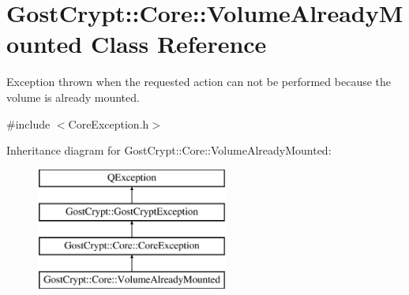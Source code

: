 \hypertarget{class_gost_crypt_1_1_core_1_1_volume_already_mounted}{}\section{Gost\+Crypt\+:\+:Core\+:\+:Volume\+Already\+Mounted Class Reference}
\label{class_gost_crypt_1_1_core_1_1_volume_already_mounted}


Exception thrown when the requested action can not be performed because the volume is already mounted.  




{\ttfamily \#include $<$Core\+Exception.\+h$>$}

Inheritance diagram for Gost\+Crypt\+:\+:Core\+:\+:Volume\+Already\+Mounted\+:\begin{figure}[H]
\begin{center}
\leavevmode
\includegraphics[height=4.000000cm]{class_gost_crypt_1_1_core_1_1_volume_already_mounted}
\end{center}
\end{figure}
